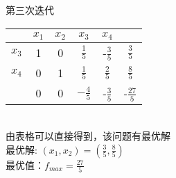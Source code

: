 \documentclass{article}
\begin{document}
第三次迭代
\begin{table}[h]
    \setlength{\belowcaptionskip}{0.cm}
    \centering
    \begin{tabular}
        {>{}rccccc}
        \toprule[1pt]
        \rowcolor[gray]{0.9}    &$x_1$ &$x_2$   &$x_3$  &$x_4$ & \\
        \midrule
        $x_3$   &1   &0  &$\frac{1}{5}$  &-$\frac{3}{5}$ & $\frac{3}{5}$  \\
        $x_4$   &0 &1    &$\frac{1}{5}$  &$\frac{2}{5}$ & $\frac{8}{5}$  \\
        & 0 & 0 & $-\frac{4}{5}$ & -$\frac{3}{5}$ & -$\frac{27}{5}$\\
        \bottomrule[1pt]
        \end{tabular}
\end{table}
\\
由表格可以直接得到，该问题有最优解\\
最优解: $(x_1,x_2)=(\frac{3}{5},\frac{8}{5})$\\
最优值：$f_{max}=\frac{27}{5}$
\end{document}
